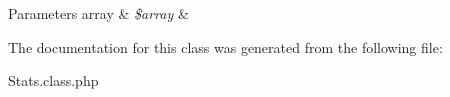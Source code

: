 \begin{DoxyParams}[1]{Parameters}
array & {\em \$array} & \\
\hline
\end{DoxyParams}


The documentation for this class was generated from the following file\-:\begin{DoxyCompactItemize}
\item 
Stats.\-class.\-php\end{DoxyCompactItemize}
